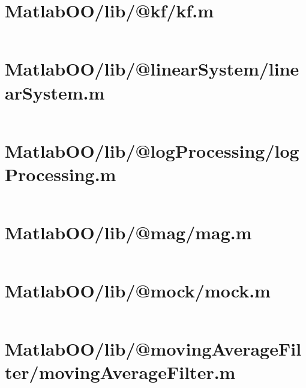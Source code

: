 \pagebreak
\section{MatlabOO/lib/@kf/kf.m}\label{code:MatlabOO/lib/@kf/kf.m}
\inputminted[linenos,fontsize=\scriptsize]{matlab}{/home/dcouture/git/mathyourlife/TSatPy/beta_versions/matlab_object_oriented/lib/@kf/kf.m}

\pagebreak
\section{MatlabOO/lib/@linearSystem/linearSystem.m}\label{code:MatlabOO/lib/@linearSystem/linearSystem.m}
\inputminted[linenos,fontsize=\scriptsize]{matlab}{/home/dcouture/git/mathyourlife/TSatPy/beta_versions/matlab_object_oriented/lib/@linearSystem/linearSystem.m}

\pagebreak
\section{MatlabOO/lib/@logProcessing/logProcessing.m}\label{code:MatlabOO/lib/@logProcessing/logProcessing.m}
\inputminted[linenos,fontsize=\scriptsize]{matlab}{/home/dcouture/git/mathyourlife/TSatPy/beta_versions/matlab_object_oriented/lib/@logProcessing/logProcessing.m}

\pagebreak
\section{MatlabOO/lib/@mag/mag.m}\label{code:MatlabOO/lib/@mag/mag.m}
\inputminted[linenos,fontsize=\scriptsize]{matlab}{/home/dcouture/git/mathyourlife/TSatPy/beta_versions/matlab_object_oriented/lib/@mag/mag.m}

\pagebreak
\section{MatlabOO/lib/@mock/mock.m}\label{code:MatlabOO/lib/@mock/mock.m}
\inputminted[linenos,fontsize=\scriptsize]{matlab}{/home/dcouture/git/mathyourlife/TSatPy/beta_versions/matlab_object_oriented/lib/@mock/mock.m}

\pagebreak
\section{MatlabOO/lib/@movingAverageFilter/movingAverageFilter.m}\label{code:MatlabOO/lib/@movingAverageFilter/movingAverageFilter.m}
\inputminted[linenos,fontsize=\scriptsize]{matlab}{/home/dcouture/git/mathyourlife/TSatPy/beta_versions/matlab_object_oriented/lib/@movingAverageFilter/movingAverageFilter.m}

